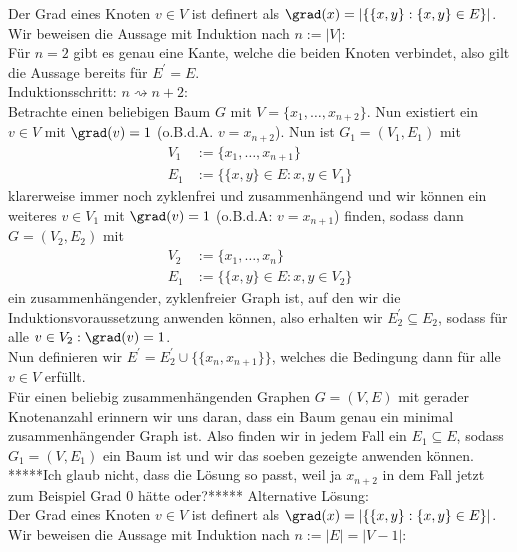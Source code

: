 \begin{solution}
Der Grad eines Knoten $v \in V$
ist definert als $\grad(x) = |\{\{x,y\}: \{x,y\} \in E\}|$. \\
Wir beweisen die Aussage mit Induktion nach $n := |V|$: \\
Für $n = 2$ gibt es genau eine Kante, welche die beiden Knoten verbindet,
also gilt die Aussage bereits für $E^{\prime} = E$. \\
Induktionsschritt: $n \rightsquigarrow n + 2$: \\
Betrachte einen beliebigen Baum $G$ mit $V = \{x_1,\dots,x_{n+2}\}$.
Nun existiert ein $v \in V$ mit $\grad(v) = 1$ (o.B.d.A. $v = x_{n+2}$).
Nun ist $G_1 = (V_1,E_1)$ mit
\begin{align*}
  V_1 &:= \{x_1,\dots,x_{n+1}\} \\
  E_1 &:= \{\{x,y\} \in E: x,y \in V_1\}
\end{align*}
klarerweise immer noch zyklenfrei und zusammenhängend und wir können
ein weiteres $v \in V_1$ mit $\grad(v) = 1$ (o.B.d.A: $v = x_{n+1}$) finden, sodass
dann $G = (V_2,E_2)$ mit
\begin{align*}
  V_2 &:= \{x_1,\dots,x_{n}\} \\
    E_1 &:= \{\{x,y\} \in E: x,y \in V_2\}
\end{align*}
ein zusammenhängender, zyklenfreier Graph ist, auf den wir die Induktionsvoraussetzung
anwenden können, also erhalten wir $E_2^{\prime} \subseteq E_2$, sodass
für alle $v \in V_2: \grad(v) = 1$. \\
Nun definieren wir $E^{\prime} = E_2^{\prime} \cup \{\{x_n,x_{n+1}\}\}$, welches
die Bedingung dann für alle $v \in V$ erfüllt. \\


Für einen beliebig zusammenhängenden Graphen $G = (V,E)$ mit gerader Knotenanzahl
erinnern wir uns daran, dass
ein Baum genau ein minimal zusammenhängender Graph ist.
Also finden wir in jedem Fall ein $E_1 \subseteq E$, sodass $G_1 = (V,E_1)$
ein Baum ist und wir das soeben gezeigte anwenden können.  \\

*****Ich glaub nicht, dass die Lösung so passt, weil ja $x_{n+2}$ in dem Fall jetzt zum Beispiel Grad $0$ hätte oder?***** Alternative Lösung: \\

Der Grad eines Knoten $v \in V$
ist definert als $\grad(x) = |\{\{x,y\}: \{x,y\} \in E\}|$. \\
Wir beweisen die Aussage mit Induktion nach $n := |E| = |V-1|$: \\


\end{solution}
